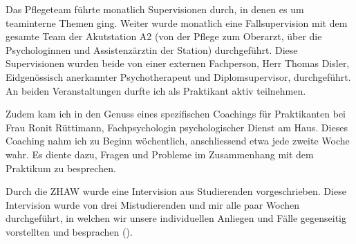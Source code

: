 Das Pflegeteam führte monatlich Supervisionen durch, in denen es um teaminterne Themen ging. Weiter wurde monatlich eine Fallsupervision mit dem gesamte Team der Akutstation A2 (von der Pflege zum Oberarzt, über die Psychologinnen und Assistenzärztin der Station) durchgeführt. Diese Supervisionen wurden beide von einer externen Fachperson, Herr Thomas Disler, Eidgenössisch anerkannter Psychotherapeut und Diplomsupervisor, durchgeführt. An beiden Veranstaltungen durfte ich als Praktikant aktiv teilnehmen. 

Zudem kam ich in den Genuss eines spezifischen Coachings für Praktikanten bei Frau Ronit Rüttimann, Fachpsychologin psychologischer Dienst am Haus. Dieses Coaching nahm ich zu Beginn wöchentlich, anschliessend etwa jede zweite Woche wahr. Es diente dazu, Fragen und Probleme im Zusammenhang mit dem Praktikum zu besprechen.

Durch die ZHAW wurde eine Intervision aus Studierenden vorgeschrieben. Diese Intervision wurde von drei Mistudierenden und mir alle paar Wochen durchgeführt, in welchen wir unsere individuellen Anliegen und Fälle gegenseitig vorstellten und besprachen (). 


